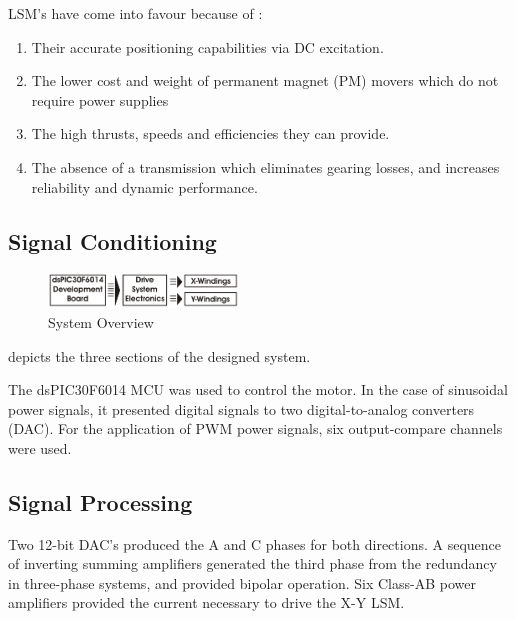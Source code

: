 \documentclass[10pt,twocolumn]{witseiepaper}
\begin{document}
LSM's have come into favour because of \cite{Halbach-1,XY-Thrust}:
\begin{enumerate}
	\item Their accurate positioning capabilities via DC excitation.
	\item The lower cost and weight of permanent magnet (PM) movers which do not require power supplies
	\item The high thrusts, speeds and efficiencies they can provide.
	\item The absence of a transmission which eliminates gearing losses, and increases reliability and dynamic performance.
\end{enumerate}

\subsection{Signal Conditioning}

\begin{figure}[ht]
	\centering
		\includegraphics[width=0.45\textwidth]{../../Drawings/Flow-Diagram.pdf}
	\caption{System Overview}
	\label{fig:Sys}
\end{figure}
 depicts the three sections of the designed system.

The dsPIC30F6014 MCU \cite{Microchip} was used to control the motor.  In the
case of sinusoidal power signals, it presented digital signals to two
digital-to-analog converters (DAC).  For the application of PWM power signals,
six output-compare channels were used.

\subsection{Signal Processing}

Two 12-bit DAC's produced the A and C phases for both directions.  A sequence
of inverting summing amplifiers generated the third phase from the redundancy
in three-phase systems, and provided bipolar operation.  Six Class-AB power
amplifiers provided the current necessary to drive the X-Y LSM.

\end{document}
